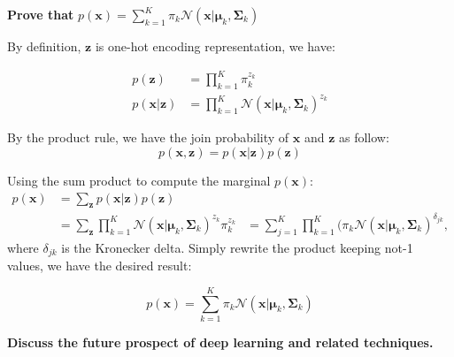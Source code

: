 \documentclass[12pt,twoside]{article}
\begin{document}
\begin{exercises}

\problem \textbf{Prove that} $p(\mathbf{x}) = \sum_{k=1}^{K} \pi_k \mathcal{N}(\mathbf{x}|\boldsymbol \mu_k,\boldsymbol \Sigma_k)$

\ifsolution \solution{}
By definition, $\mathbf{z}$ is one-hot encoding representation, we have:

\begin{equation*}
  \begin{aligned}
    p(\mathbf{z}) & = \prod^{K}_{k=1} \pi_k^{z_k} \\
    p(\mathbf{x}|\mathbf{z}) & = \prod^{K}_{k=1} \mathcal{N} (\mathbf{x}|\boldsymbol \mu_k, \boldsymbol \Sigma_k)^{z_k}
  \end{aligned}
\end{equation*}

By the product rule, we have the join probability of $\mathbf{x}$ and $\mathbf{z}$ as follow:
$$ p(\mathbf{x}, \mathbf{z}) = p(\mathbf{x}|\mathbf{z}) p(\mathbf{z}) $$

Using the sum product to compute the marginal $p(\mathbf{x})$:
\begin{equation*}
  \begin{aligned}
    p(\mathbf{x}) & = \sum_{\mathbf{z}} p(\mathbf{x}|\mathbf{z}) p(\mathbf{z})\\
                  & = \sum_{\mathbf{z}} \prod^{K}_{k=1} \mathcal{N} (\mathbf{x}|\boldsymbol \mu_k, \boldsymbol \Sigma_k)^{z_k} \pi_k^{z_k}
                  & = \sum_{j=1}^{K} \prod^{K}_{k=1} (\pi_k \mathcal{N}(\mathbf{x}|\boldsymbol \mu_k, \boldsymbol \Sigma_k)^{\delta_{jk}},
  \end{aligned}
\end{equation*}
where $\delta_{jk}$ is the Kronecker delta. Simply rewrite the product keeping not-1 values, we have the desired result:

$$ p(\mathbf{x}) = \sum_{k=1}^{K} \pi_k \mathcal{N}(\mathbf{x}|\boldsymbol \mu_k,\boldsymbol \Sigma_k) $$

\fi

\problem \textbf{Discuss the future prospect of deep learning and related techniques.}


\end{exercises}
\end{document}
